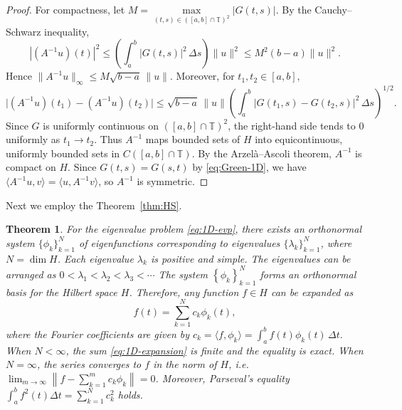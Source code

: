 \documentclass{article}
\newtheorem{theorem}{Theorem}[section]
\numberwithin{equation}{section}
\numberwithin{theorem}{section}
\begin{document}
\begin{proof}

\smallskip

For compactness, let $M=\max\limits_{(t,s)\in\left([a,b]\cap\mathbb{T}\right)^2}|G(t,s)|$. By the Cauchy--Schwarz inequality,
$$|(A^{-1}u)(t)|^2 \le \left(\int_a^b |G(t,s)|^2\,\Delta s\right)\|u\|^2 \le M^2(b-a)\|u\|^2.$$
Hence $\|A^{-1}u\|_\infty\le M\sqrt{b-a}\,\|u\|$. Moreover, for $t_1,t_2\in[a,b]$,
$$\Big|(A^{-1}u)(t_1)-(A^{-1}u)(t_2)\Big| \le \sqrt{b-a}\,\|u\| \left(\int_a^b |G(t_1,s)-G(t_2,s)|^2\,\Delta s\right)^{1/2}.$$
Since $G$ is uniformly continuous on $\left([a,b]\cap\mathbb{T}\right)^2$, the right-hand side tends to $0$ uniformly as $t_1\to t_2$. Thus $A^{-1}$ maps bounded sets of $H$ into equicontinuous, uniformly bounded sets in $C([a,b]\cap\mathbb{T})$. By the Arzel\`a--Ascoli theorem, $A^{-1}$ is compact on $H$. Since $G(t,s)=G(s,t)$ by \eqref{eq:Green-1D}, we have $\langle A^{-1}u, v\rangle = \langle u, A^{-1}v\rangle$, so $A^{-1}$ is symmetric.
\end{proof}

Next we employ the Theorem~\ref{thm:HS}.

\begin{theorem}\label{thm:1D-expansion}
For the eigenvalue problem \eqref{eq:1D-evp}, there exists an orthonormal system $\{\phi_k\}_{k=1}^N$ of eigenfunctions corresponding to eigenvalues $\{\lambda_k\}_{k=1}^N$, where $N = \dim H$. Each eigenvalue $\lambda_k$ is positive and simple. The eigenvalues can be arranged as
$0 < \lambda_1 < \lambda_2 < \lambda_3 < \cdots$
The system $\left\{\phi_k\right\}_{k=1}^N$ forms an orthonormal basis for the Hilbert space $H$. Therefore, any function $f \in H$ can be expanded as
\begin{equation}
\label{eq:1D-expansion}
f(t) = \sum_{k=1}^{N} c_k \phi_k(t),
\end{equation}
where the Fourier coefficients are given by
$c_k = \langle f, \phi_k \rangle =\displaystyle \int_a^b f(t) \phi_k(t) \, \Delta t.$
When $N < \infty$, the sum \eqref{eq:1D-expansion} is finite and the equality is exact. When $N = \infty$, the series converges to $f$ in the norm of $H$, i.e.
$\displaystyle\lim_{m \to \infty} \left\| f - \displaystyle\sum_{k=1}^{m} c_k \phi_k \right\| = 0$. Moreover, Parseval's equality $\displaystyle\int_a^b f^2(t) \Delta t = \sum_{k=1}^{N} c_k^2$ holds.
\end{theorem}
\end{document}
